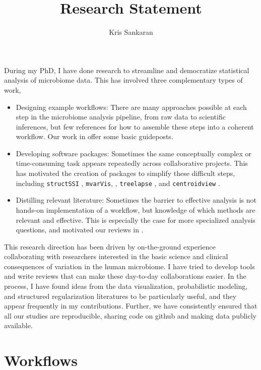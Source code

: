 \documentclass{article}
\title{Research Statement}
\author{Kris Sankaran}
\begin{document}
\maketitle

During my PhD, I have done research to streamline and democratize statistical
analysis of microbiome data. This has involved three complementary types of
work,
\begin{itemize}
\item Designing example workflows: There are many approaches possible at each
  step in the microbiome analysis pipeline, from raw data to scientific
  inferences, but few references for how to assemble these steps into a coherent
  workflow. Our work in \citep{Callahan2016, Fukuyama2017} offer some basic
  guideposts.
\item Developing software packages: Sometimes the same conceptually complex or
  time-consuming task appears repeatedly across collaborative projects. This has
  motivated the creation of packages to simplify these difficult steps,
  including \texttt{structSSI} \citep{sankaran2014structssi}, \texttt{mvarVis},
  \citep{mvarvis}, \texttt{treelapse} \citep{Sankaran2017}, and
  \texttt{centroidview} \citep{centroidview}.
\item Distilling relevant literature: Sometimes the barrier to effective analysis is not
  hands-on implementation of a workflow, but knowledge of which methods are
  relevant and effective. This is especially the case for more specialized
  analysis questions, and motivated our reviews in
  \citep{sankaran2017latent}.
\end{itemize}

This research direction has been driven by on-the-ground experience
collaborating with researchers interested in the basic science and clinical
consequences of variation in the human microbiome. I have tried to develop tools
and write reviews that can make these day-to-day collaborations easier. In the
process, I have found ideas from the data visualization, probabilistic modeling,
and structured regularization literatures to be particularly useful, and they
appear frequently in my contributions. Further, we have consistently ensured
that all our studies are reproducible, sharing code on github and making data
publicly available.

\section{Workflows}
\end{document}
